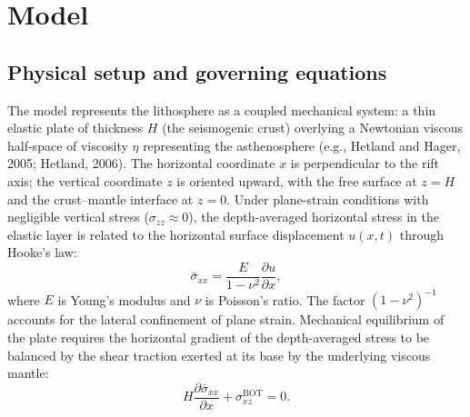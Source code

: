 \documentclass[12pt]{article}
\begin{document}
\section{Model}
\label{sec:model}

\subsection{Physical setup and governing equations}
\label{sec:setup}

The model represents the lithosphere as a coupled mechanical system: a thin
elastic plate of thickness $H$ (the seismogenic crust) overlying a
Newtonian viscous half-space of viscosity $\eta$ representing the asthenosphere
(e.g., Hetland and Hager, 2005; Hetland, 2006).
The horizontal coordinate $x$ is perpendicular to the rift axis; the vertical
coordinate $z$ is oriented upward, with the free surface at $z = H$ and the
crust--mantle interface at $z = 0$. Under plane-strain conditions with
negligible vertical stress ($\sigma_{zz}\approx 0$), the depth-averaged
horizontal stress in the elastic layer is related to the horizontal surface
displacement $u(x,t)$ through Hooke's law:
\begin{equation}
\bar{\sigma}_{xx} = \frac{E}{1-\nu^2}\frac{\partial u}{\partial x},
\label{eq:hookean}
\end{equation}
where $E$ is Young's modulus and $\nu$ is Poisson's ratio. The factor
$(1-\nu^2)^{-1}$ accounts for the lateral confinement of plane strain.
Mechanical equilibrium of the plate requires the horizontal gradient of the
depth-averaged stress to be balanced by the shear traction exerted at its base
by the underlying viscous mantle:
\begin{equation}
H\frac{\partial\bar{\sigma}_{xx}}{\partial x} + \sigma_{xz}^{\text{BOT}} = 0.
\label{eq:equil}
\end{equation}
\end{document}
